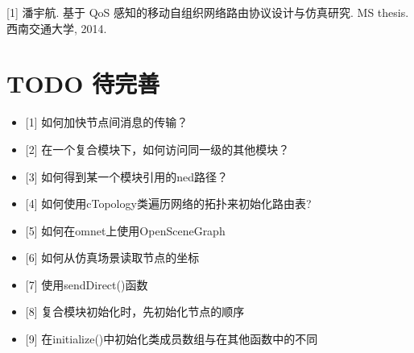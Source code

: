 {[1]} 潘宇航. 基于 QoS 感知的移动自组织网络路由协议设计与仿真研究. MS thesis. 西南交通大学, 2014.

\chapter{TODO 待完善}
\label{todo待完善}

\begin{itemize}
\item {[1]} 如何加快节点间消息的传输？

\item {[2]} 在一个复合模块下，如何访问同一级的其他模块？

\item {[3]} 如何得到某一个模块引用的ned路径？

\item {[4]} 如何使用cTopology类遍历网络的拓扑来初始化路由表?

\item {[5]} 如何在omnet上使用OpenSceneGraph

\item {[6]} 如何从仿真场景读取节点的坐标

\item {[7]} 使用sendDirect()函数

\item {[8]} 复合模块初始化时，先初始化节点的顺序

\item {[9]} 在initialize()中初始化类成员数组与在其他函数中的不同

\end{itemize}
